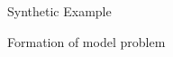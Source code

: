 %	
%	
%	
%
%		
%		


\begin{frame}{Synthetic Example}
\begin{center}
{\large Formation of model problem}
\end{center}
\begin{figure}
		\centering
		
	\label{fig:formation_model_1_original}
\end{figure}
\end{frame}


